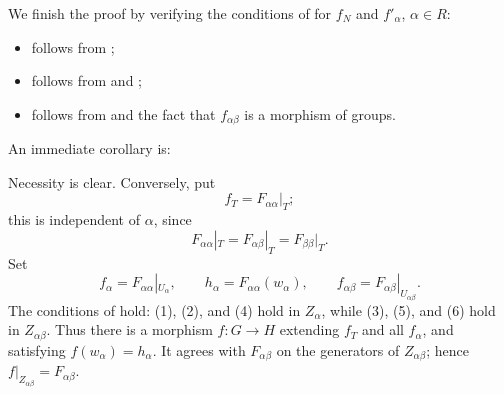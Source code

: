 We finish the proof by verifying the conditions of  for
\(f_N\) and \(f'_\alpha\), \(\alpha\in R\):
\begin{itemize}
  \item {} follows from ;
  \item {} follows from  and ;
  \item {} follows from  and the fact that
    \(f_{\alpha\beta}\) is a morphism of groups.
\end{itemize}

An immediate corollary is:


Necessity is clear. Conversely, put
\[
  f_T=F_{\alpha\alpha}|_T;
\]
this is independent of \(\alpha\), since
\[
  F_{\alpha\alpha}|_T
   =F_{\alpha\beta}|_T
   =F_{\beta\beta}|_T.
\]
Set
\[
  f_\alpha=F_{\alpha\alpha}|_{U_\alpha},\qquad
  h_\alpha=F_{\alpha\alpha}(w_\alpha),\qquad
  f_{\alpha\beta}=F_{\alpha\beta}|_{U_{\alpha\beta}}.
\]
The conditions of  hold: (1), (2), and (4) hold in
\(Z_\alpha\), while (3), (5), and (6) hold in \(Z_{\alpha\beta}\).
Thus there is a morphism \(f:G\to H\) extending \(f_T\) and all
\(f_\alpha\), and satisfying \(f(w_\alpha)=h_\alpha\). It agrees
with \(F_{\alpha\beta}\) on the generators of \(Z_{\alpha\beta}\);
hence \(f|_{Z_{\alpha\beta}}=F_{\alpha\beta}\).


